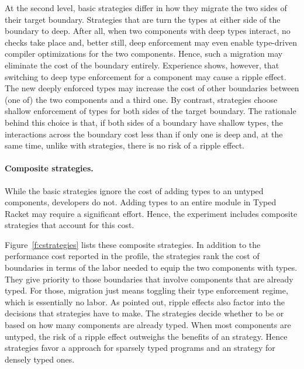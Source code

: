At the second level, basic strategies differ in how they migrate the two sides
 of their target boundary. Strategies that are \optkw{} turn the types at either
 side of the boundary to deep. After all, when two components with deep types
 interact, no checks take place and, better still, deep enforcement may even
 enable type-driven compiler optimizations for the two components.  Hence, such
 a migration may eliminate the cost of the boundary entirely.  Experience shows,
 however, that switching to deep type enforcement for a component may cause a
 ripple effect. The new deeply enforced types may increase the cost of other
 boundaries between (one of) the two components and a third one. By contrast,
 \conkw{} strategies choose shallow enforcement of types for both sides of the
 target boundary. The rationale behind this choice is that, if both sides of a
 boundary have shallow types, the interactions across the boundary cost less
 than if only one is deep and, at the same time, unlike with \optkw{}
 strategies, there is no risk of a ripple effect.



\paragraph{Composite strategies.} While the basic strategies ignore the cost of
 adding types to an untyped components, developers do not. Adding types to an
 entire module in Typed Racket may require a significant effort. Hence, the
 experiment includes composite strategies that account for this cost.

Figure~\ref{f:cstrategies} lists these composite strategies. In addition to the
 performance cost reported in the profile, the \costkw{} strategies rank the
 cost of boundaries in terms of the labor needed to equip the two components
 with types.  They give priority to those boundaries that involve components
 that are already typed.  For those, migration just means toggling their type
 enforcement regime, which is essentially no labor.  As pointed out, ripple
 effects also factor into the decisions that strategies have to make. The
 \confkw{} strategies decide whether to be \optkw{} or \conkw{} based on how
 many components are already typed.  When most components are untyped, the risk
 of a ripple effect outweighs the benefits of an \optkw{} strategy. Hence
 strategies favor a \conkw{} approach for sparsely typed programs and an
 \optkw{} strategy for densely typed ones.

